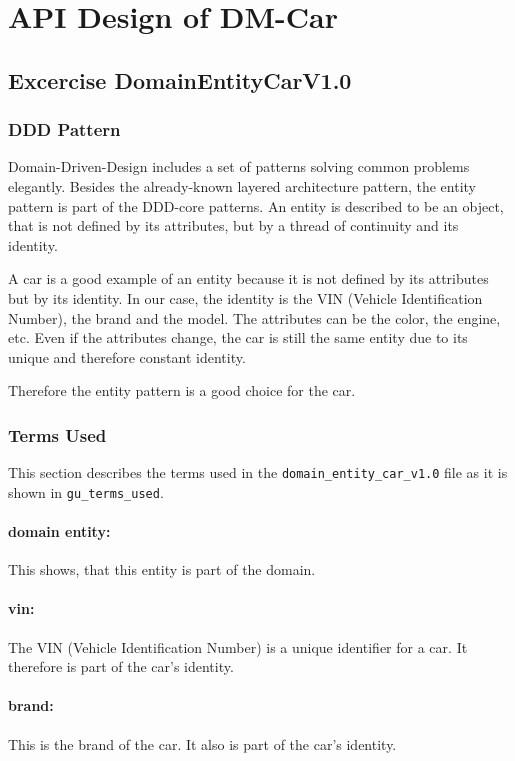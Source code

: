 \section{API Design of DM-Car}
\label{sec:api_design}
\subsection{Excercise DomainEntityCarV1.0}
\label{subsec:domain_entity_car_v1.0}
\subsubsection*{DDD Pattern}
\label{subsubsec:ddd_pattern}
Domain-Driven-Design includes a set of patterns solving common problems elegantly.
Besides the already-known layered architecture pattern, the entity pattern is part of the DDD-core patterns.
An entity is described to be an object, that is not defined by its attributes, but by a thread of continuity and its identity.

A car is a good example of an entity because it is not defined by its attributes but by its identity.
In our case, the identity is the VIN (Vehicle Identification Number), the brand and the model.
The attributes can be the color, the engine, etc.
Even if the attributes change, the car is still the same entity due to its unique and therefore constant identity.

Therefore the entity pattern is a good choice for the car.

\subsubsection*{Terms Used}
This section describes the terms used in the \texttt{domain\_entity\_car\_v1.0} file as it is shown in \texttt{gu\_terms\_used}.
\paragraph*{domain entity:}
This shows, that this entity is part of the domain.
\paragraph*{vin:}
The VIN (Vehicle Identification Number) is a unique identifier for a car.
It therefore is part of the car's identity.
\paragraph*{brand:}
This is the brand of the car.
It also is part of the car's identity.
